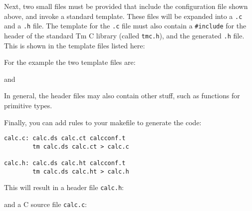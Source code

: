 Next, two small files must be provided that include the configuration
file shown above, and invoke a standard template. These files will be
expanded into a \verb'.c' and a \verb'.h' file. The template for the
\verb'.c' file must also contain a \verb'#include' for the header of the
standard Tm C library (called \verb'tmc.h'), and the generated \verb'.h'
file. This is shown in the template files listed here:

For the example the two template files are:
\begin{showfile}
\end{showfile}
and
\begin{showfile}
\end{showfile}
In general, the header files may also contain other stuff,
such as functions for primitive types.

Finally, you can add rules to your makefile to generate the code:
\begin{showfile}
\begin{verbatim}
calc.c: calc.ds calc.ct calcconf.t
        tm calc.ds calc.ct > calc.c

calc.h: calc.ds calc.ht calcconf.t
        tm calc.ds calc.ht > calc.h
\end{verbatim}
\end{showfile}
This will result in a header file \verb'calc.h':
\begin{showfile}
\end{showfile}
and a C source file \verb'calc.c':
\begin{showfile}
\end{showfile}
